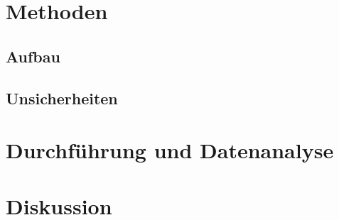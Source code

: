 \section{Methoden}
	
	
	\subsection{Aufbau}
			

	\subsection{Unsicherheiten} 


\section{Durchführung und Datenanalyse}


\section{Diskussion}

